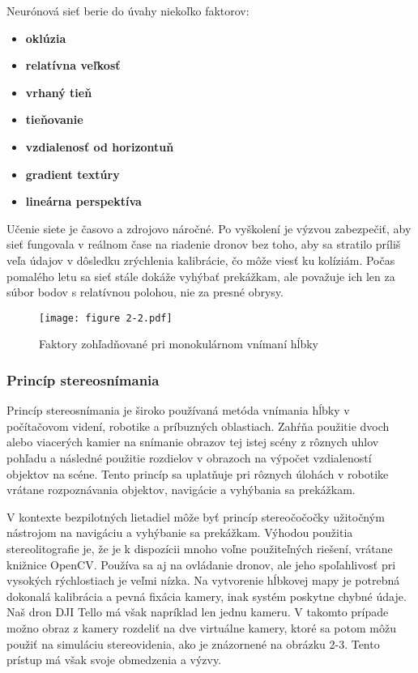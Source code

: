 Neurónová sieť berie do úvahy niekoľko faktorov:
\begin{itemize}
    \item \textbf{oklúzia}
    \item \textbf{relatívna veľkosť}
    \item \textbf{vrhaný tieň}
    \item \textbf{tieňovanie}
    \item \textbf{vzdialenosť od horizontuň}
    \item \textbf{gradient textúry}
    \item \textbf{lineárna perspektíva}
\end{itemize}
Učenie siete je časovo a zdrojovo náročné. Po vyškolení je výzvou zabezpečiť, aby sieť fungovala v reálnom čase na riadenie dronov bez toho, aby sa stratilo príliš veľa údajov v dôsledku zrýchlenia kalibrácie, čo môže viesť ku kolíziám. Počas pomalého letu sa sieť stále dokáže vyhýbať prekážkam, ale považuje ich len za súbor bodov s relatívnou polohou, nie za presné obrysy.

\begin{figure}[ht!]
    \centering
    \texttt{[image: figure 2-2.pdf]}
    \caption{Faktory zohľadňované pri monokulárnom vnímaní hĺbky}
    \label{o:2-2}
\end{figure}

\subsubsection{Princíp stereosnímania}
Princíp stereosnímania je široko používaná metóda vnímania hĺbky v počítačovom videní, robotike a príbuzných oblastiach. Zahŕňa použitie dvoch alebo viacerých kamier na snímanie obrazov tej istej scény z rôznych uhlov pohľadu a následné použitie rozdielov v obrazoch na výpočet vzdialeností objektov na scéne. Tento princíp sa uplatňuje pri rôznych úlohách v robotike vrátane rozpoznávania objektov, navigácie a vyhýbania sa prekážkam.

V kontexte bezpilotných lietadiel môže byť princíp stereočočočky užitočným nástrojom na navigáciu a vyhýbanie sa prekážkam. Výhodou použitia stereolitografie je, že je k dispozícii mnoho voľne použiteľných riešení, vrátane knižnice OpenCV. Používa sa aj na ovládanie dronov, ale jeho spoľahlivosť pri vysokých rýchlostiach je veľmi nízka. Na vytvorenie hĺbkovej mapy je potrebná dokonalá kalibrácia a pevná fixácia kamery, inak systém poskytne chybné údaje. Naš dron DJI Tello má však napríklad len jednu kameru. V takomto prípade možno obraz z kamery rozdeliť na dve virtuálne kamery, ktoré sa potom môžu použiť na simuláciu stereovidenia, ako je znázornené na obrázku 2-3. Tento prístup má však svoje obmedzenia a výzvy.

